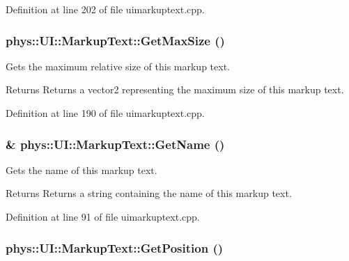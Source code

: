 Definition at line 202 of file uimarkuptext.cpp.

\hypertarget{classphys_1_1UI_1_1MarkupText_ae68fd261f2dc9494a16e3089c7a35b8a}{
\subsubsection[{GetMaxSize}]{ phys::UI::MarkupText::GetMaxSize ()}}
\label{d7/d23/classphys_1_1UI_1_1MarkupText_ae68fd261f2dc9494a16e3089c7a35b8a}


Gets the maximum relative size of this markup text. 

\begin{DoxyReturn}{Returns}
Returns a vector2 representing the maximum size of this markup text. 
\end{DoxyReturn}


Definition at line 190 of file uimarkuptext.cpp.

\hypertarget{classphys_1_1UI_1_1MarkupText_afa64067f890466ad4844c4836e7667fd}{
\subsubsection[{GetName}]{ \& phys::UI::MarkupText::GetName ()}}
\label{d7/d23/classphys_1_1UI_1_1MarkupText_afa64067f890466ad4844c4836e7667fd}


Gets the name of this markup text. 

\begin{DoxyReturn}{Returns}
Returns a string containing the name of this markup text. 
\end{DoxyReturn}


Definition at line 91 of file uimarkuptext.cpp.

\hypertarget{classphys_1_1UI_1_1MarkupText_a9d92f03e1cad181a5d8f20f3f95cf7cc}{
\subsubsection[{GetPosition}]{ phys::UI::MarkupText::GetPosition ()}}
\label{d7/d23/classphys_1_1UI_1_1MarkupText_a9d92f03e1cad181a5d8f20f3f95cf7cc}


